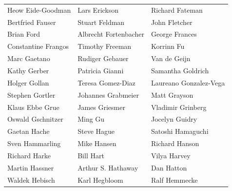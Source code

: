\begin{tabular}{lll}
Heow Eide-Goodman      & Lars Erickson          & Richard Fateman\\
Bertfried Fauser       & Stuart Feldman         & John Fletcher\\
Brian Ford             & Albrecht Fortenbacher  & George Frances\\
Constantine Frangos    & Timothy Freeman        & Korrinn Fu\\
Marc Gaetano           & Rudiger Gebauer        & Van de Geijn\\
Kathy Gerber           & Patricia Gianni        & Samantha Goldrich\\
Holger Gollan          & Teresa Gomez-Diaz      & Laureano Gonzalez-Vega \\
Stephen Gortler        & Johannes Grabmeier     & Matt Grayson\\
Klaus Ebbe Grue        & James Griesmer         & Vladimir Grinberg\\
Oswald Gschnitzer      & Ming Gu                & Jocelyn Guidry\\
Gaetan Hache           & Steve Hague            & Satoshi Hamaguchi\\
Sven Hammarling        & Mike Hansen            & Richard Hanson\\
Richard Harke          & Bill Hart              & Vilya Harvey\\
Martin Hassner         & Arthur S. Hathaway     & Dan Hatton\\
Waldek Hebisch         & Karl Hegbloom          & Ralf Hemmecke\\
\end{tabular}
\vfill
\newpage
